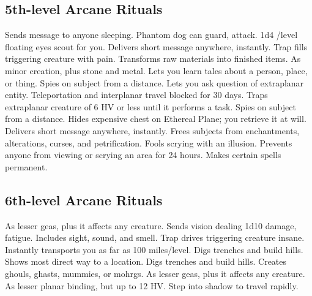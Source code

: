 \subsection{5th-level Arcane Rituals}
\begin{rituallist}
   Sends message to anyone sleeping.
   Phantom dog can guard, attack.
   1d4 /level floating eyes scout for you.
   Delivers short message anywhere, instantly.
   Trap fills triggering creature with pain.
   Transforms raw materials into finished items.
   As minor creation, plus stone and metal.
  \F Lets you learn tales about a person, place, or thing.
  \F Spies on subject from a distance.
   Lets you ask question of extraplanar entity.
   Teleportation and interplanar travel blocked for 30 days.
   Traps extraplanar creature of 6 HV or less until it performs a task.
  \F Spies on subject from a distance.
  \F Hides expensive chest on Ethereal Plane; you retrieve it at will.
   Delivers short message anywhere, instantly.
   Frees subjects from enchantments, alterations, curses, and petrification.
   Fools scrying with an illusion.
   Prevents anyone from viewing or scrying an area for 24 hours.
   Makes certain spells permanent.
\end{rituallist}

\subsection{6th-level Arcane Rituals}
\begin{rituallist}
   As lesser geas, plus it affects any creature.
   Sends vision dealing 1d10 damage, fatigue.
   Includes sight, sound, and smell.
   Trap drives triggering creature insane.
   Instantly transports you as far as 100 miles/level.
   Digs trenches and build hills.
   Shows most direct way to a location.
   Digs trenches and build hills.
   Creates ghouls, ghasts, mummies, or mohrgs.
   As lesser geas, plus it affects any creature.
   As lesser planar binding, but up to 12 HV.
   Step into shadow to travel rapidly.
\end{rituallist}


